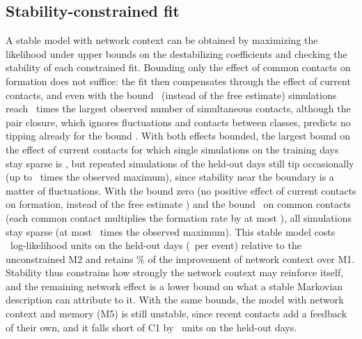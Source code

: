 \subsection{Stability-constrained fit}
A stable model with network context can be obtained by maximizing the likelihood under upper bounds on the destabilizing coefficients and checking the stability of each constrained fit.
Bounding only the effect of common contacts on formation does not suffice: the fit then compensates through the effect of current contacts, and even with the bound \ClosureOnlyBound\ (instead of the free estimate) simulations reach \ClosureOnlyRatio\ times the largest observed number of simultaneous contacts, although the pair closure, which ignores fluctuations and contacts between classes, predicts no tipping already for the bound \StableFtri.
With both effects bounded, the largest bound on the effect of current contacts for which single simulations on the training days stay sparse is \SingleSeedBound, but repeated simulations of the held-out days still tip occasionally (up to \SingleSeedRatio\ times the observed maximum), since stability near the boundary is a matter of fluctuations.
With the bound zero (no positive effect of current contacts on formation, instead of the free estimate \StableFdegFree) and the bound \StableFtri\ on common contacts (each common contact multiplies the formation rate by at most \StableFtriFactor), all simulations stay sparse (at most \StableRatio\ times the observed maximum).
This stable model costs \StablePrice\ log-likelihood units on the held-out days (\StablePricePerEvent\ per event) relative to the unconstrained M2 and retains \StableRetained\% of the improvement of network context over M1.
Stability thus constrains how strongly the network context may reinforce itself, and the remaining network effect is a lower bound on what a stable Markovian description can attribute to it.
With the same bounds, the model with network context and memory (M5) is still unstable, since recent contacts add a feedback of their own, and it falls short of C1 by \ConeOverBoundedMfive\ units on the held-out days.


